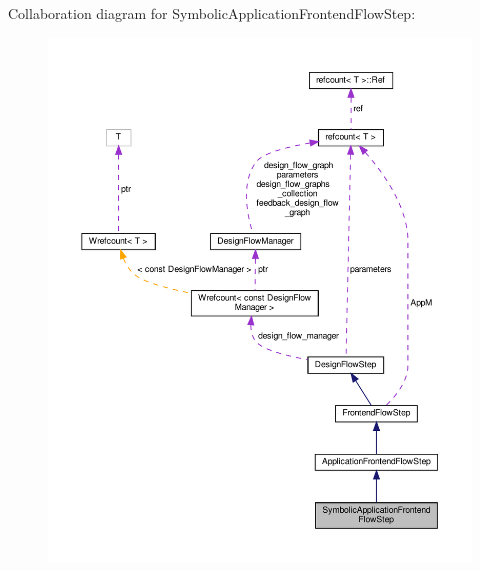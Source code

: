 Collaboration diagram for Symbolic\+Application\+Frontend\+Flow\+Step\+:
\nopagebreak
\begin{figure}[H]
\begin{center}
\leavevmode
\includegraphics[width=350pt]{d2/de1/classSymbolicApplicationFrontendFlowStep__coll__graph}
\end{center}
\end{figure}
